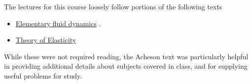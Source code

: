 The lectures for this course loosely follow portions of the following texts

\begin{itemize}
\item \href{http://www.amazon.com/Elementary-Dynamics-Applied-Mathematics-Computing/dp/0198596790/ref=sr_1_1?ie=UTF8&qid=1326302753&sr=8-1}{Elementary fluid dynamics} \citep{acheson1990elementary}.
\item \href{http://www.amazon.com/Theory-Elasticity-Third-Theoretical-Physics/dp/075062633X/ref=sr_1_6?s=books&ie=UTF8&qid=1326302957&sr=1-6}{Theory of Elasticity} \citep{landau1960theory}
\end{itemize}

While these were not required reading, the Acheson text was particularly helpful in providing additional details about subjects covered in class, and for supplying useful problems for study.
